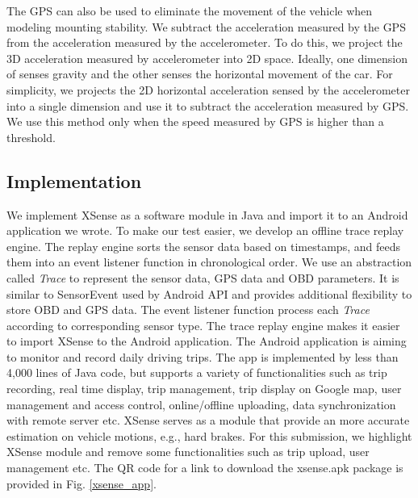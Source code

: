 The GPS can also be used to eliminate the movement of the vehicle
when modeling mounting stability. 
We subtract the acceleration measured by the GPS from
the acceleration measured by the accelerometer. 
To do this, we project the 3D acceleration measured
by accelerometer into 2D space. 
Ideally, one dimension of senses gravity and the other
senses the horizontal movement of the car. 
For simplicity, we projects the 2D horizontal 
acceleration sensed by the accelerometer
into a single dimension and use it to subtract the acceleration
measured by GPS. 
We use this method only when the speed measured by GPS
is higher than a threshold. 


\subsection{Implementation}


We implement XSense as a software module in Java and 
import it to an Android application we wrote.
To make our test easier, we develop an offline 
trace replay engine.
The replay engine sorts the sensor data
based on timestamps, and feeds them into an event listener function in chronological order. 
We use an abstraction called \emph{Trace} to represent the sensor data, 
GPS data and OBD parameters.
It is similar to SensorEvent used by Android API \cite{sensor}
and provides additional flexibility to store OBD and GPS data. 
The event listener function process each \emph{Trace} 
according to corresponding sensor type.  
The trace replay engine makes it easier to import
XSense to the Android application. 
The Android application is aiming to monitor and record
daily driving trips. 
The app is implemented by less than 4,000 lines of Java code, 
but supports a variety of functionalities such as
trip recording, real time display, trip management,
trip display on Google map, user management and access control, 
online/offline uploading, data synchronization with remote server etc. 
XSense serves as a module that provide an more accurate
estimation on vehicle motions, e.g., hard brakes. 
For this submission, we highlight XSense module 
and remove some functionalities such as
trip upload, user management etc.
The QR code for a link to download the xsense.apk package is provided in Fig. \ref{xsense_app}. 

